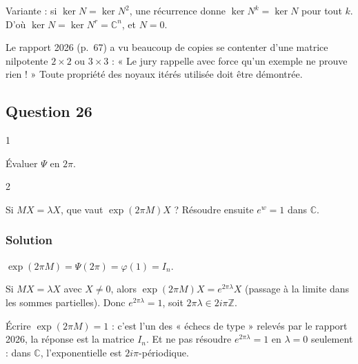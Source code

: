 \documentclass[11pt,a4paper]{article}
\newcommand{\equationajustee}[1]{%
  \sbox{\boiteequation}{$\displaystyle #1$}%
  \ifdim\wd\boiteequation>\linewidth
    \[\resizebox{\linewidth}{!}{\usebox{\boiteequation}}\]%
  \else
    \[#1\]%
  \fi}
\begin{document}
Variante : si \(\ker N=\ker N^2\), une récurrence donne \(\ker N^k=\ker N\) pour tout \(k\). D'où \(\ker N=\ker N^r=\mathbb C^n\), et \(N=0\).

\begin{jury}

Le rapport 2026 (p.~67) a vu beaucoup de copies se contenter d'une matrice nilpotente \(2\times2\) ou \(3\times3\) : « Le jury rappelle avec force qu'un exemple ne prouve rien ! » Toute propriété des noyaux itérés utilisée doit être démontrée.

\end{jury}

\hypertarget{question-26}{%
\subsection{Question 26}\label{question-26}}

\begin{indication}{1}

Évaluer \(\Psi\) en \(2\pi\).

\end{indication}

\begin{indication}{2}

Si \(MX=\lambda X\), que vaut \(\exp(2\pi M)X\) ? Résoudre ensuite \(e^w=1\) dans \(\mathbb C\).

\end{indication}

\hypertarget{solution-25}{%
\subsubsection{Solution}\label{solution-25}}

\(\exp(2\pi M)=\Psi(2\pi)=\varphi(1)=I_n\).

Si \(MX=\lambda X\) avec \(X\ne0\), alors \(\exp(2\pi M)X=e^{2\pi\lambda}X\) (passage à la limite dans les sommes partielles). Donc \(e^{2\pi\lambda}=1\), soit \(2\pi\lambda\in2i\pi\mathbb Z\).

\equationajustee{\boxed{\exp(2\pi M)=I_n}}

\equationajustee{\boxed{{\mathrm{Sp}}_{\mathbb C}(M)\subset i\mathbb Z}}

\begin{piege}

Écrire \(\exp(2\pi M)=1\) : c'est l'un des « échecs de type » relevés par le rapport 2026, la réponse est la matrice \(I_n\). Et ne pas résoudre \(e^{2\pi\lambda}=1\) en \(\lambda=0\) seulement : dans \(\mathbb C\), l'exponentielle est \(2i\pi\)-périodique.

\end{piege}
\end{document}
